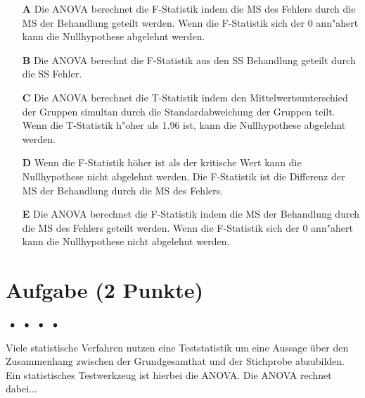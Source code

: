 \documentclass[a4paper, 9pt]{scrartcl}\usepackage[]{graphicx}\usepackage[]{xcolor}
\begin{document}
\begin{enumerate}
\item [\textbf{A} \msquare] Die ANOVA berechnet die F-Statistik indem die MS des Fehlers durch die MS der Behandlung geteilt werden. Wenn die F-Statistik sich der 0 ann{"a}hert kann die Nullhypothese abgelehnt werden.
\item [\textbf{B} \msquare] Die ANOVA berechnt die F-Statistik aus den SS Behandlung geteilt durch die SS Fehler.
\item [\textbf{C} \msquare] Die ANOVA berechnet die T-Statistik indem den Mittelwertsunterschied der Gruppen simultan durch die Standardabweichung der Gruppen teilt. Wenn die T-Statistik h{"o}her als 1.96 ist, kann die Nullhypothese abgelehnt werden.
\item [\textbf{D} \msquare] Wenn die F-Statistik höher ist als der kritische Wert kann die Nullhypothese nicht abgelehnt werden. Die F-Statistik ist die Differenz der MS der Behandlung durch die MS des Fehlers.
\item [\textbf{E} \msquare] Die ANOVA berechnet die F-Statistik indem die MS der Behandlung durch die MS des Fehlers geteilt werden. Wenn die F-Statistik sich der 0 ann{"a}hert kann die Nullhypothese nicht abgelehnt werden.
\end{enumerate}

\section{Aufgabe \hfill (2 Punkte)}

\ifcollection
\begin{flushright}
\tiny\vspace{-2Ex}
\textbf{\examinhaltstart}
\exammodulemathstat $\;\bullet$
\exammodulestat $\;\bullet$
\exammodulestatbbv $\;\bullet$
\exammodulestatversuch $\;\bullet$
\exammodulebiostat
\vspace{-1Ex}
\end{flushright}
\fi




Viele statistische Verfahren nutzen eine Teststatistik um eine Aussage über den Zusammenhang zwischen der Grundgesamthat und der Stichprobe abzubilden. Ein statistisches Testwerkzeug ist hierbei die ANOVA. Die ANOVA rechnet dabei...
\end{document}

